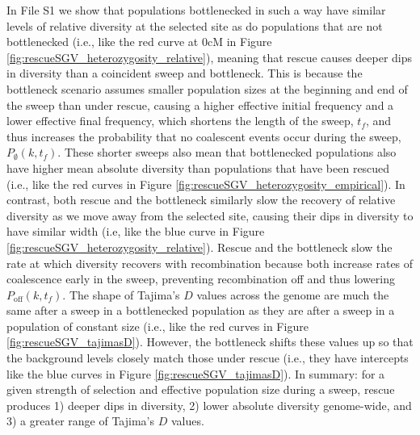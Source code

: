 \documentclass[]{article}
\begin{document}
In File S1 we show that populations bottlenecked in such a way have similar levels of relative diversity at the selected site as do populations that are not bottlenecked (i.e., like the red curve at 0cM in Figure \ref{fig:rescueSGV_heterozygosity_relative}), meaning that rescue causes deeper dips in diversity than a coincident sweep and bottleneck.
This is because the bottleneck scenario assumes smaller population sizes at the beginning and end of the sweep than under rescue, causing a higher effective initial frequency and a lower effective final frequency, which shortens the length of the sweep, $t_f$, and thus increases the probability that no coalescent events occur during the sweep, $P_\emptyset(k,t_f)$.
These shorter sweeps also mean that bottlenecked populations also have higher mean absolute diversity than populations that have been rescued (i.e., like the red curves in Figure \ref{fig:rescueSGV_heterozygosity_empirical}).
In contrast, both rescue and the bottleneck similarly slow the recovery of relative diversity as we move away from the selected site, causing their dips in diversity to have similar width (i.e, like the blue curve in Figure \ref{fig:rescueSGV_heterozygosity_relative}).
Rescue and the bottleneck slow the rate at which diversity recovers with recombination because both increase rates of coalescence early in the sweep, preventing recombination off and thus lowering $P_\mathrm{off}(k,t_f)$.
The shape of Tajima's $D$ values across the genome are much the same after a sweep in a bottlenecked population as they are after a sweep in a population of constant size (i.e., like the red curves in Figure \ref{fig:rescueSGV_tajimasD}).
However, the bottleneck shifts these values up so that the background levels closely match those under rescue (i.e., they have intercepts like the blue curves in Figure \ref{fig:rescueSGV_tajimasD}).
In summary: for a given strength of selection and effective population size during a sweep, rescue produces 1) deeper dips in diversity, 2) lower absolute diversity genome-wide, and 3) a greater range of Tajima's $D$ values.
\end{document}
